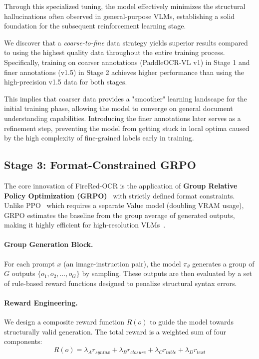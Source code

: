 Through this specialized tuning, the model effectively minimizes the structural hallucinations often observed in general-purpose VLMs, establishing a solid foundation for the subsequent reinforcement learning stage.

\begin{insight}[title=Insight 1: Benefits of Progressive Annotation Refinement.]
We discover that a \textit{coarse-to-fine} data strategy yields superior results compared to using the highest quality data throughout the entire training process. Specifically, training on coarser annotations (PaddleOCR-VL v1) in Stage 1 and finer annotations (v1.5) in Stage 2 achieves higher performance than using the high-precision v1.5 data for both stages.

This implies that coarser data provides a "smoother" learning landscape for the initial training phase, allowing the model to converge on general document understanding capabilities. Introducing the finer annotations later serves as a refinement step, preventing the model from getting stuck in local optima caused by the high complexity of fine-grained labels early in training.
\end{insight}

\subsection{Stage 3: Format-Constrained GRPO}
\label{sec:grpo}
The core innovation of FireRed-OCR is the application of \textbf{Group Relative Policy Optimization (GRPO)}~\cite{shao2024deepseekmath} with strictly defined format constraints. Unlike PPO~\cite{schulman2017proximal} which requires a separate Value model (doubling VRAM usage), GRPO estimates the baseline from the group average of generated outputs, making it highly efficient for high-resolution VLMs~\cite{bai2025qwen3,huang2026step3}.

\paragraph{Group Generation Block.}
For each prompt $x$ (an image-instruction pair), the model $\pi_\theta$ generates a group of $G$ outputs $\{o_1, o_2, ..., o_G\}$ by sampling. These outputs are then evaluated by a set of rule-based reward functions designed to penalize structural syntax errors.

\paragraph{Reward Engineering.}
We design a composite reward function $R(o)$ to guide the model towards structurally valid generation. The total reward is a weighted sum of four components:
\begin{equation}
    R(o) = \lambda_A r_{syntax} + \lambda_B r_{closure} + \lambda_C r_{table} + \lambda_D r_{text}
\end{equation}

